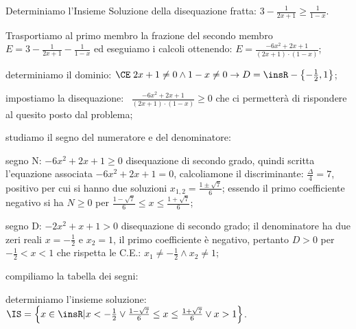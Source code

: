 \begin{exrig}
\begin{esempio}
Determiniamo l'Insieme Soluzione della disequazione fratta: $3-\frac 1{2x+1}\ge \frac 1{1-x}$.
\begin{enumeratea}
\item Trasportiamo al primo membro la frazione del secondo membro $E=3-\frac 1{2x+1}-\frac 1{1-x}$ ed eseguiamo i calcoli ottenendo: $E=\frac{-6x^2+2x+1}{(2x+1)\cdot (1-x)}$;
\item determiniamo il dominio: $\CE \;2x+1\neq 0\wedge 1-x\neq 0\to D=\insR-\left\{-\frac 1 2,1\right\}$;
\item impostiamo la disequazione: \ $\frac{-6x^2+2x+1}{(2x+1)\cdot (1-x)}\ge 0$ che ci permetterà di rispondere al quesito posto dal problema;
\item studiamo il segno del numeratore e del denominatore:
\begin{itemize*}
\item segno N: $-6x^2+2x+1\ge 0$ disequazione di secondo grado, quindi scritta l’equazione associata $-6x^2+2x+1=0$, calcoliamone il discriminante: $\frac{\Delta } 4=7$, positivo per cui si hanno due soluzioni $x_{1,2}=\frac{1\pm \sqrt 7} 6$; essendo il primo coefficiente negativo si ha $N\ge 0$ per $\frac{1-\sqrt 7} 6\le x\le \frac{1+\sqrt 7} 6$;
\item segno D: $-2x^2+x+1>0$ disequazione di secondo grado; il denominatore ha due zeri reali $x=-\frac 1 2$ e $x_2=1$, il primo coefficiente è negativo, pertanto $D>0$ per $-\frac 1 2<x<1$ che rispetta le C.E.: $x_1\neq -\frac 1 2\wedge x_2\neq 1$;
\end{itemize*}
\item compiliamo la tabella dei segni:
\begin{center}
 
\end{center}
\item determiniamo l'insieme soluzione: $\IS=\left\{x\in \insR | x<-\frac 1 2\vee \frac{1-\sqrt 7} 6\le x\le \frac{1+\sqrt 7} 6\vee x>1\right\}$.
\end{enumeratea}
\end{esempio}
\end{exrig}

\vspazio\ovalbox{\risolvii \ref{ese:4.58}, \ref{ese:4.59}, \ref{ese:4.60}, \ref{ese:4.61}, \ref{ese:4.62}, \ref{ese:4.63}, \ref{ese:4.64}, \ref{ese:4.65}, \ref{ese:4.66}, \ref{ese:4.67}, \ref{ese:4.68}, \ref{ese:4.69}, \ref {ese:4.70},}

\vspazio\ovalbox{\ref{ese:4.71}, \ref{ese:4.72}, \ref{ese:4.47}, \ref{ese:4.73}, \ref{ese:4.74}}


